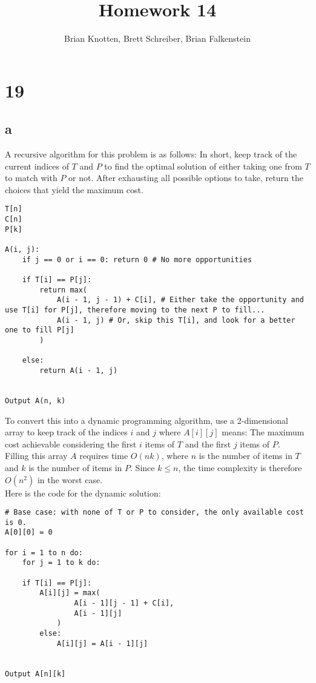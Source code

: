 \documentclass[letterpaper,notitlepage,twoside]{article}
\begin{document}
\title{Homework 14}
\author{Brian Knotten, Brett Schreiber, Brian Falkenstein}
\maketitle

\section*{19}
\subsection*{a}
A recursive algorithm for this problem is as follows:
In short, keep track of the current indices of $T$ and $P$ to find the optimal solution of either taking one from $T$ to match with $P$ or not. After exhausting all possible options to take, return the choices that yield the maximum cost. 
\begin{verbatim}
T[n]
C[n]
P[k]

A(i, j):
    if j == 0 or i == 0: return 0 # No more opportunities

    if T[i] == P[j]:
        return max(
            A(i - 1, j - 1) + C[i], # Either take the opportunity and use T[i] for P[j], therefore moving to the next P to fill...
            A(i - 1, j) # Or, skip this T[i], and look for a better one to fill P[j]
        )
		
    else:
        return A(i - 1, j)
	

Output A(n, k)
\end{verbatim}

To convert this into a dynamic programming algorithm, use a 2-dimensional array to keep track of the indices $i$ and $j$ where $A[i][j]$ means: The maximum cost achievable considering the first $i$ items of $T$ and the first $j$ items of $P$. \\

Filling this array $A$ requires time $O(nk)$, where $n$ is the number of items in $T$ and $k$ is the number of items in $P$. Since $k \leq n$, the time complexity is therefore $O(n^2)$ in the worst case. \\

Here is the code for the dynamic solution:
\begin{verbatim}
# Base case: with none of T or P to consider, the only available cost is 0.
A[0][0] = 0

for i = 1 to n do:
    for j = 1 to k do:
        
	if T[i] == P[j]:
	    A[i][j] = max(
                A[i - 1][j - 1] + C[i],
                A[i - 1][j]
            )
        else:
            A[i][j] = A[i - 1][j]


Output A[n][k]
\end{verbatim}
\end{document}
